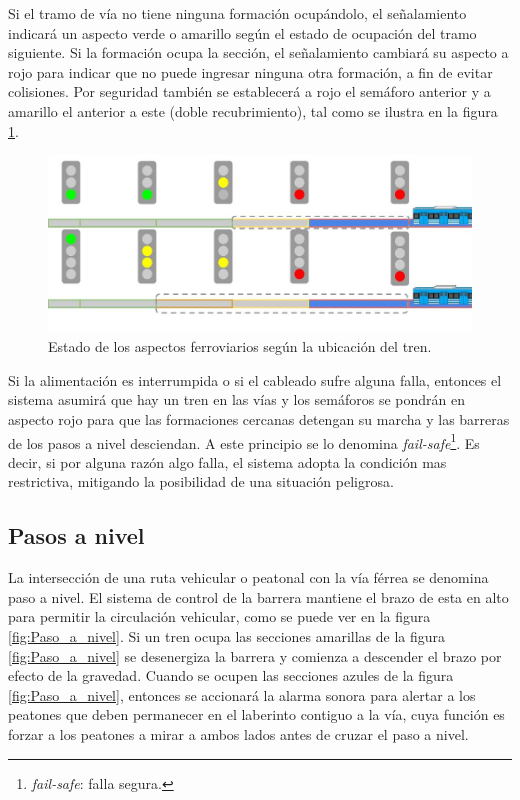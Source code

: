 			\vspace{7cm}
			
			Si el tramo de vía no tiene ninguna formación ocupándolo, el señalamiento indicará un aspecto verde o amarillo según el estado de ocupación del tramo siguiente. Si la formación ocupa la sección, el señalamiento cambiará su aspecto a rojo para indicar que no puede ingresar ninguna otra formación, a fin de evitar colisiones. Por seguridad también se establecerá a rojo el semáforo anterior y a amarillo el anterior a este (doble recubrimiento), tal como se ilustra en la figura \ref{fig:Recubrimiento}.			
					
			\begin{figure}[h]
				\centering
				\includegraphics[scale=.4]{./Figures/Recubrimiento}
				\caption{Estado de los aspectos ferroviarios según la ubicación del tren.}
				\label{fig:Recubrimiento}
			\end{figure}			
			
			Si la alimentación es interrumpida o si el cableado sufre alguna falla, entonces el sistema asumirá que hay un tren en las vías y los semáforos se pondrán en aspecto rojo para que las formaciones cercanas detengan su marcha y las barreras de los pasos a nivel desciendan. A este principio se lo denomina \textit{fail-safe}\footnote{\textit{fail-safe}: falla segura.}. Es decir, si por alguna razón algo falla, el sistema adopta la condición mas restrictiva, mitigando la posibilidad de una situación peligrosa. 		
			
		\subsection{Pasos a nivel}
		
			La intersección de una ruta vehicular o peatonal con la vía férrea se denomina paso a nivel. El sistema de control de la barrera mantiene el brazo de esta en alto para permitir la circulación vehicular, como se puede ver en la figura \ref{fig:Paso_a_nivel}. Si un tren ocupa las secciones amarillas de la figura \ref{fig:Paso_a_nivel} se desenergiza la barrera y comienza a descender el brazo por efecto de la gravedad. Cuando se ocupen las secciones azules de la figura \ref{fig:Paso_a_nivel}, entonces se accionará la alarma sonora para alertar a los peatones que deben permanecer en el laberinto contiguo a la vía, cuya función es forzar a los peatones a mirar a ambos lados antes de cruzar el paso a nivel.			
			

